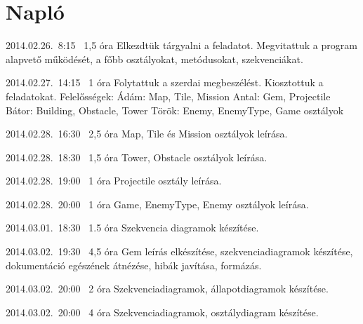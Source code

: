 %
\section{Napló}

\begin{naplo}

\bejegyzes
{2014.02.26.~8:15~} %
{1,5 óra} %
{\vadam\newline
\vantal\newline
\vbator\newline
\vtorok}
{Elkezdtük tárgyalni a feladatot. Megvitattuk a program alapvető működését, a főbb osztályokat, metódusokat, szekvenciákat.}

\bejegyzes
{2014.02.27.~14:15~}
{1 óra}
{\vadam\newline
\vantal\newline
\vbator\newline
\vtorok}
{Folytattuk a szerdai megbeszélést. Kiosztottuk a feladatokat. \newline Felelősségek: \newline
Ádám: Map, Tile, Mission \newline
Antal: Gem, Projectile \newline
Bátor: Building, Obstacle, Tower \newline
Török: Enemy, EnemyType, Game \newline osztályok}

\bejegyzes
{2014.02.28.~16:30~}
{2,5 óra}
{\vadam}
{Map, Tile és Mission osztályok leírása.}

\bejegyzes
{2014.02.28.~18:30~}
{1,5 óra}
{\vbator}
{Tower, Obstacle osztályok leírása.}

\bejegyzes
{2014.02.28.~19:00~}
{1 óra}
{\vantal}
{Projectile osztály leírása.}

\bejegyzes
{2014.02.28.~20:00~}
{1 óra}
{\vtorok}
{Game, EnemyType, Enemy osztályok leírása.}

\bejegyzes
{2014.03.01.~18:30~}
{1.5 óra}
{\vadam}
{Szekvencia diagramok készítése.}

\bejegyzes
{2014.03.02.~19:30~}
{4,5 óra}
{\vantal}
{Gem leírás elkészítése, szekvenciadiagramok készítése, dokumentáció egészének átnézése, hibák javítása, formázás.}

\bejegyzes
{2014.03.02.~20:00~}
{2 óra}
{\vadam}
{Szekvenciadiagramok, állapotdiagramok készítése.}

\bejegyzes
{2014.03.02.~20:00~}
{4 óra}
{\vbator}
{Szekvenciadiagramok, osztálydiagram készítése.}


\end{naplo}
